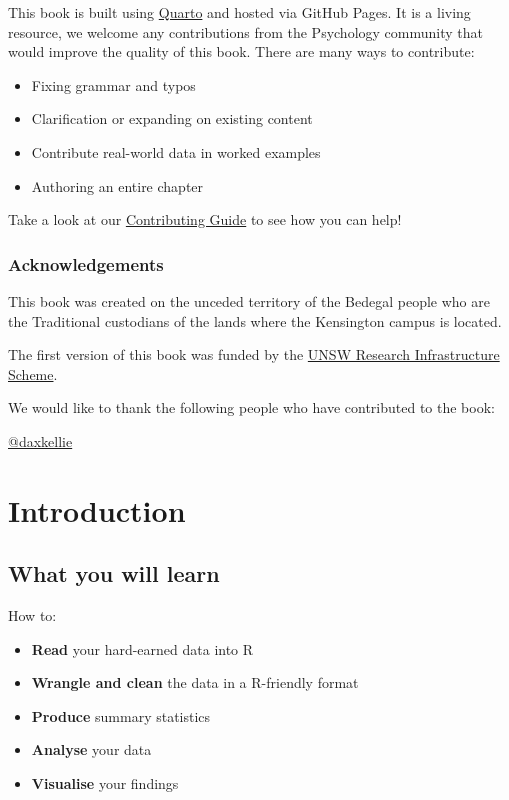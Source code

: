 \documentclass[
  letterpaper,
  DIV=11,
  numbers=noendperiod]{scrreprt}
\providecommand{\tightlist}{%
  \setlength{\itemsep}{0pt}\setlength{\parskip}{0pt}}\usepackage{longtable,booktabs,array}
\begin{document}
This book is built using \href{https://quarto.org/docs/}{Quarto} and
hosted via GitHub Pages. It is a living resource, we welcome any
contributions from the Psychology community that would improve the
quality of this book. There are many ways to contribute:

\begin{itemize}
\tightlist
\item
  Fixing grammar and typos
\item
  Clarification or expanding on existing content
\item
  Contribute real-world data in worked examples
\item
  Authoring an entire chapter
\end{itemize}

Take a look at our \href{contributing.qmd}{Contributing Guide} to see
how you can help!

\subsection*{Acknowledgements}\label{acknowledgements}

This book was created on the unceded territory of the Bedegal people who
are the Traditional custodians of the lands where the Kensington campus
is located.

The first version of this book was funded by the
\href{https://research.unsw.edu.au/research-infrastructure}{UNSW
Research Infrastructure Scheme}.

We would like to thank the following people who have contributed to the
book:

\href{https://github.com/daxkellie}{@daxkellie}


\chapter{Introduction}\label{introduction}

\section{What you will learn}\label{what-you-will-learn}

How to:

\begin{itemize}
\tightlist
\item
  \textbf{Read} your hard-earned data into R
\item
  \textbf{Wrangle and clean} the data in a R-friendly format
\item
  \textbf{Produce} summary statistics
\item
  \textbf{Analyse} your data
\item
  \textbf{Visualise} your findings
\end{itemize}
\end{document}
